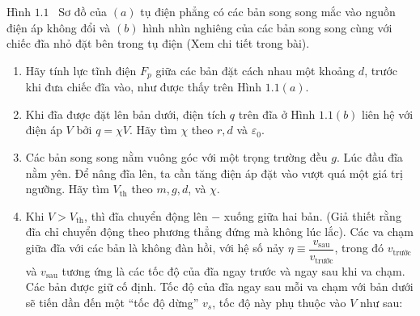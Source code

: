 \begin{vd}
\begin{center}
\end{center}
\begin{center}
    Hình $1.1$ \ Sơ đồ của $(a)$ tụ điện phẳng có các bản song song mắc vào nguồn điện áp không đổi và $(b)$ hình nhìn nghiêng của các bản song song cùng với chiếc đĩa nhỏ đặt bên trong tụ điện (Xem chi tiết trong bài).
\end{center}
\begin{enumerate}[1)]
    \item Hãy tính lực tĩnh điện $F_{{p}}$ giữa các bản đặt cách nhau một khoảng $d$, trước khi đưa chiếc đĩa vào, như được thấy trên Hình $1.1(a)$.
    \item Khi đĩa được đặt lên bản dưới, điện tích $q$ trên đĩa ở Hình $1.1({b})$ liên hệ với điện áp $V$ bởi $q = \chi{V}$. Hãy tìm $\chi$ theo $r, d$ và $\varepsilon_{0}$.
    \item Các bản song song nằm vuông góc với một trọng trường đều $g$. Lúc đầu đĩa nằm yên. Để nâng đĩa lên, ta cần tăng điện áp đặt vào vượt quá một giá trị ngưỡng. Hãy tìm $V_{\mathrm{th}}$ theo $m, g, d$, và $\chi.$
    \item Khi $V > V_{\mathrm{th}}$, thì đĩa chuyển động lên $-$ xuống giữa hai bản. (Giả thiết rằng đĩa chỉ chuyển động theo phương thẳng đứng mà không lúc lắc). Các va chạm giữa đĩa với các bản là không đàn hồi, với hệ số nảy $\eta \equiv \dfrac{{v}_{\text{sau}}}{{v}_{\text{trước}}}$, trong đó ${v}_{\text {trước}}$ và ${v}_{\text{sau}}$ tương ứng là các tốc độ của đĩa ngay trước và ngay sau khi va chạm. Các bản được giữ cố định. Tốc độ của đĩa ngay sau mỗi va chạm với bản dưới sẽ tiến dần đến một ``tốc độ dừng'' ${v}_{{s}}$, tốc độ này phụ thuộc vào ${V}$ như sau:

\end{enumerate}
\end{vd}
